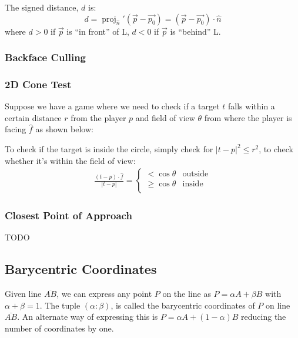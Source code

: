 \documentclass[12pt]{report}
\newcommand\pgfmathsinandcos[3]{%
  \pgfmathsetmacro#1{sin(#3)}%
  \pgfmathsetmacro#2{cos(#3)}%
}
\begin{document}
The signed distance, $d$ is:
$$
d = \operatorname{proj}_{\hat{n}}'(\vec{p} - \vec{p_0}) = (\vec{p} - \vec{p_0}) \cdot \hat{n}
$$
where $d > 0$ if $\vec{p}$ is ``in front'' of L, $d < 0$ if $\vec{p}$ is ``behind'' L.
\subsubsection{Backface Culling}
\subsubsection{2D Cone Test}
Suppose we have a game where we need to check if a target $t$ falls within a certain distance $r$ from the player $p$ and field of view $\theta$ from where the player is facing $\hat{f}$ as shown below:
\begin{center}
\end{center}
To check if the target is inside the circle, simply check for $|t - p|^2 \leq r^2$, to check whether it's within the field of view:
\begin{align}
	\frac{(t - p) \cdot \hat{f}}{|t - p|} = \begin{cases}
	< \cos\theta    & \text{outside} \\
	\geq \cos\theta & \text{inside}  \\
	\end{cases}
\end{align}
		
\subsubsection{Closest Point of Approach}
TODO
\subsection{Barycentric Coordinates}
Given line $\overline{AB}$, we can express any point $P$ on the line as $P = \alpha A + \beta B$ with $\alpha + \beta = 1$. The tuple $(\alpha : \beta)$, is called the barycentric coordinates of $P$ on line $\overline{AB}$. An alternate way of expressing this is $P = \alpha A + (1 - \alpha) B$ reducing the number of coordinates by one.
		
\end{document}
